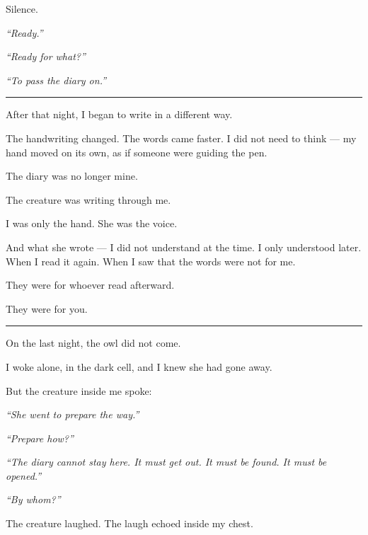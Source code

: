 \noindent Silence.

\noindent \textit{\textquotedblleft{}Ready.\textquotedblright{}}

\noindent \textit{\textquotedblleft{}Ready for what?\textquotedblright{}}

\noindent \textit{\textquotedblleft{}To pass the diary on.\textquotedblright{}}

\vspace{0.5em}\noindent\rule{\textwidth}{0.5pt}\vspace{0.5em}

\noindent After that night, I began to write in a different way.

\noindent The handwriting changed. The words came faster. I did not need to think --- my hand moved on its own, as if someone were guiding the pen.

\noindent The diary was no longer mine.

\noindent The creature was writing through me.

\noindent I was only the hand.
She was the voice.

\noindent And what she wrote --- I did not understand at the time. I only understood later. When I read it again. When I saw that the words were not for me.

\noindent They were for whoever read afterward.

\noindent They were for you.

\vspace{0.5em}\noindent\rule{\textwidth}{0.5pt}\vspace{0.5em}

\noindent On the last night, the owl did not come.

\noindent I woke alone, in the dark cell, and I knew she had gone away.

\noindent But the creature inside me spoke:

\noindent \textit{\textquotedblleft{}She went to prepare the way.\textquotedblright{}}

\noindent \textit{\textquotedblleft{}Prepare how?\textquotedblright{}}

\noindent \textit{\textquotedblleft{}The diary cannot stay here. It must get out. It must be found. It must be opened.\textquotedblright{}}

\noindent \textit{\textquotedblleft{}By whom?\textquotedblright{}}

\noindent The creature laughed. The laugh echoed inside my chest.

